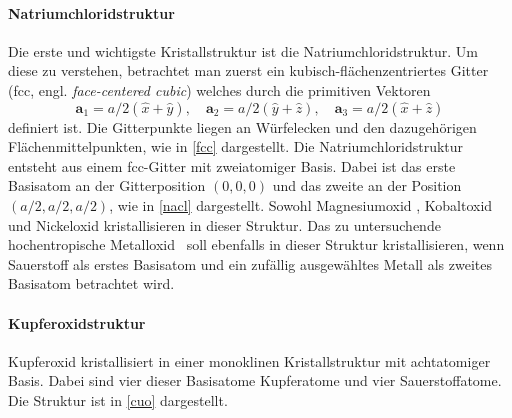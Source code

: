 \paragraph{Natriumchloridstruktur}
Die erste und wichtigste Kristallstruktur ist die Natriumchloridstruktur.
Um diese zu verstehen, betrachtet man zuerst ein kubisch-flächen\-zen\-trier\-tes Gitter (fcc, engl.
\textit{face-centered cubic}) welches durch die primitiven Vektoren
\begin{equation*}
    \mathbf{a}_1 = a / 2 (\hat{x} + \hat{y}), \quad
    \mathbf{a}_2 = a / 2 (\hat{y} + \hat{z}), \quad
    \mathbf{a}_3 = a / 2 (\hat{x} + \hat{z})
\end{equation*}
definiert ist.
Die Gitterpunkte liegen an Würfelecken und den dazugehörigen Flächenmittelpunkten, wie in \cref{fcc} dargestellt.
\autocite[37-38]{Grundmann}
Die Natriumchloridstruktur entsteht aus einem fcc-Gitter mit zweiatomiger Basis.
Dabei ist das erste Basisatom an der Gitterposition $(0,0,0)$ und das zweite an der Position $(a/2,a/2,a/2)$, wie in
\cref{nacl} dargestellt.\autocite[45]{Grundmann}
Sowohl Magnesiumoxid , Kobaltoxid  und Nickeloxid  kristallisieren in dieser Struktur.
Das zu untersuchende hochentropische Metalloxid \heo\ soll ebenfalls in dieser Struktur kristallisieren, wenn
Sauerstoff als erstes Basisatom und ein zufällig ausgewähltes Metall als zweites Basisatom betrachtet wird.

\paragraph{Kupferoxidstruktur}
Kupferoxid kristallisiert in einer monoklinen Kristall\-struk\-tur mit achtatomiger Basis.
Dabei sind vier dieser Basisatome Kupferatome und vier Sauerstoffatome.
Die Struktur ist in \cref{cuo} dargestellt.\autocite[7]{kupferoxid}

